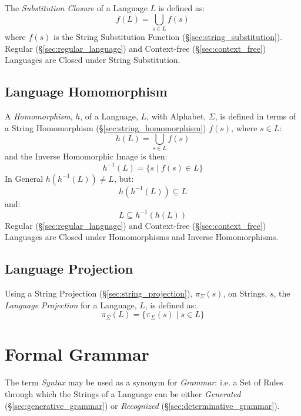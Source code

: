 The \emph{Substitution Closure} of a Language $L$ is defined as:
\[
  f(L) = \bigcup_{s \in L} f(s)
\]
where $f(s)$ is the String Substitution Function
(\S\ref{sec:string_substitution}). Regular
(\S\ref{sec:regular_language}) and Context-free
(\S\ref{sec:context_free}) Languages are Closed under String
Substitution.



\subsection{Language Homomorphism}\label{sec:language_homomorphism}

A \emph{Homomorphism}, $h$, of a Language, $L$, with Alphabet,
$\Sigma$, is defined in terms of a String Homomorphism
(\S\ref{sec:string_homomorphism}) $f(s)$, where $s \in L$:
\[
  h(L) = \bigcup_{s \in L} f(s)
\]
and the Inverse Homomorphic Image is then:
\[
  h^{-1}(L) = \{ s\;|\; f(s) \in L \}
\]
In General $h(h^{-1}(L)) \neq L$, but:
\[
  h (h^{-1}(L)) \subseteq L
\] and:
\[
  L \subseteq h^{-1}(h(L))
\]
Regular (\S\ref{sec:regular_language}) and Context-free
(\S\ref{sec:context_free}) Languages are Closed under Homomorphisms
and Inverse Homomorphisms.



\subsection{Language Projection}\label{sec:language_projection}

Using a String Projection (\S\ref{sec:string_projection}),
$\pi_{\Sigma}(s)$, on Strings, $s$, the \emph{Language Projection} for
a Language, $L$, is defined as:
\[
  \pi_{\Sigma}(L) = \{\pi_{\Sigma}(s)\;|\; s \in L\}
\]



\section{Formal Grammar}\label{sec:formal_grammar}

The term \emph{Syntax} may be used as a synonym for \emph{Grammar}:
i.e. a Set of Rules through which the Strings of a Language can be
either \emph{Generated} (\S\ref{sec:generative_grammar}) or
\emph{Recognized} (\S\ref{sec:determinative_grammar}).

